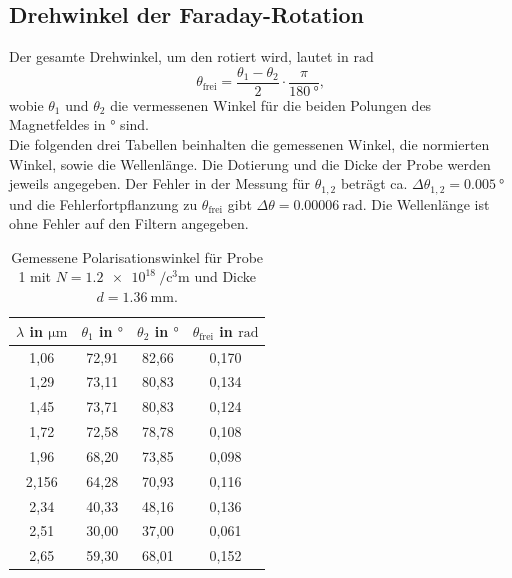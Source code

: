 \subsection{Drehwinkel der Faraday-Rotation}
Der gesamte Drehwinkel, um den rotiert wird, lautet in $\si{\radian}$
\begin{equation*}
    \theta_\text{frei} = \frac{\theta_1-\theta_2}{2} \cdot \frac{\pi}{\qty{180}{\degree}},
\end{equation*} 
wobie $\theta_1$ und $\theta_2$ die vermessenen Winkel für die beiden Polungen des Magnetfeldes in $\si{\degree}$ sind.\\
Die folgenden drei Tabellen beinhalten die gemessenen Winkel, die normierten Winkel, sowie die Wellenlänge. Die Dotierung und die Dicke der Probe werden jeweils angegeben.
Der Fehler in der Messung für $\theta_{1,2}$ beträgt ca. $\Delta \theta_{1,2} = \qty{0.005}{\degree}$ und die Fehlerfortpflanzung zu $\theta_\text{frei}$ gibt $\Delta \theta = \qty{0.00006}{\radian}$.
Die Wellenlänge ist ohne Fehler auf den Filtern angegeben.
\begin{table}[H]
    \centering
    \caption{Gemessene Polarisationswinkel für Probe 1 mit $N = \qty{1.2e18}{\per\cubic\centi\meter}$ und Dicke $d = \qty{1.36}{\milli\meter}$.}
    \label{tab:probe1}
    \begin{tabular}{c c c c}
        \toprule
        {$\lambda$ in $\si{\micro\meter}$} & {$\theta_1$ in $\si{\degree}$} & {$\theta_2$ in $\si{\degree}$} & {$\theta_\text{frei}$ in $\si{\radian}$} \\
        \midrule
        1,06 & 72,91 & 82,66 & 0,170 \\
        1,29 & 73,11 & 80,83 & 0,134 \\
        1,45 & 73,71 & 80,83 & 0,124 \\ 
        1,72 & 72,58 & 78,78 & 0,108 \\ 
        1,96 & 68,20 & 73,85 & 0,098 \\
        2,156& 64,28 & 70,93 & 0,116 \\
        2,34 & 40,33 & 48,16 & 0,136 \\
        2,51 & 30,00 & 37,00 & 0,061 \\
        2,65 & 59,30 & 68,01 & 0,152 \\
        \bottomrule
    \end{tabular}
\end{table}

